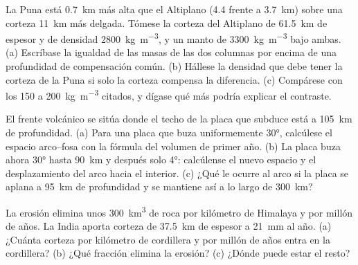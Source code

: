 \begin{exercise}[$\star\star\star$]\label{exo:b2:himalaya-andes:10}
La Puna está \qty{0.7}{km} más alta que el Altiplano (4.4 frente a \qty{3.7}{km}) sobre una corteza
\qty{11}{km} más delgada. Tómese la corteza del Altiplano de \qty{61.5}{km} de espesor y de densidad
\qty{2800}{kg.m^{-3}}, y un manto de \qty{3300}{kg.m^{-3}} bajo ambas. (a) Escríbase la
igualdad de las masas de las dos columnas por encima de una profundidad de compensación común. (b) Hállese la
densidad que debe tener la corteza de la Puna si solo la corteza compensa la diferencia. (c) Compárese
con los 150 a \qty{200}{kg.m^{-3}} citados, y dígase qué más podría explicar el contraste.
\end{exercise}

\begin{exercise}[$\star\star\star$]\label{exo:b2:himalaya-andes:11}
El frente volcánico se sitúa donde el techo de la placa que subduce está a \qty{105}{km} de profundidad. (a) Para una placa
que buza uniformemente \ang{30}, calcúlese el espacio arco--fosa con la fórmula del volumen de primer
año. (b) La placa buza ahora \ang{30} hasta \qty{90}{km} y después solo \ang{4}: calcúlense
el nuevo espacio y el desplazamiento del arco hacia el interior. (c) ¿Qué le ocurre al arco si la placa se aplana
a \qty{95}{km} de profundidad y se mantiene así a lo largo de \qty{300}{km}?
\end{exercise}

\begin{exercise}[$\star\star\star$]\label{exo:b2:himalaya-andes:12}
La erosión elimina unos \qty{300}{km^3} de roca por kilómetro de Himalaya y por millón de años.
La India aporta corteza de \qty{37.5}{km} de espesor a \qty{21}{mm} al año. (a) ¿Cuánta corteza por
kilómetro de cordillera y por millón de años entra en la cordillera? (b) ¿Qué fracción elimina la erosión?
(c) ¿Dónde puede estar el resto?
\end{exercise}

